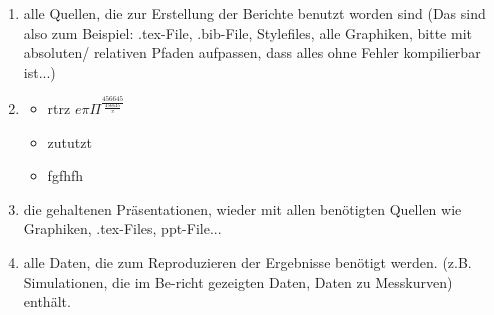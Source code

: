 \begin{enumerate}
\item alle Quellen, die zur Erstellung der Berichte benutzt worden sind (Das sind also zum Beispiel: .tex-File, .bib-File, Stylefiles, alle Graphiken, bitte mit absoluten/ relativen Pfaden aufpassen, dass alles ohne Fehler kompilierbar ist...)
\item 
\begin{itemize}
    \item rtrz $e\pi   \Pi   ^{\frac{456645}{\frac{456645}{\pi}}}$
    \item zututzt
    \item fgfhfh
\end{itemize}

\item die gehaltenen Präsentationen, wieder mit allen benötigten Quellen wie Graphiken, .tex-Files, ppt-File...
\item alle Daten, die zum Reproduzieren der Ergebnisse benötigt werden. (z.B. Simulationen, die im Be-richt gezeigten Daten, Daten zu Messkurven)
enthält.
\end{enumerate}
